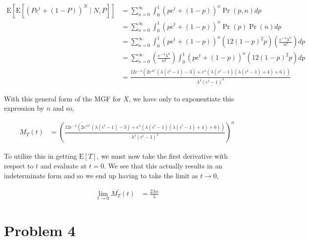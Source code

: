 \documentclass[11pt]{article}
\begin{document}
\begin{align*}
  \mathrm{E}[\mathrm{E}[(Pe^t + (1-P))^N \mid N,P]] &=
                                                      \sum_{n=0}^{\infty}
                                                      \int_0^1
                                                      (pe^t+(1-p))^n
                                                      \Pr{(p,n)} dp \\
  &= \sum_{n=0}^{\infty} \int_0^1 (pe^t+(1-p))^n \Pr{(p)} \Pr{(n)} dp \\
  &= \sum_{n=0}^{\infty} \int_0^1 (pe^t+(1-p))^n \left( 12(1-p)^2 p \right) \left(
\frac{e^{-\lambda} \lambda^n}{n!} \right) dp \\
  &= \sum_{n=0}^{\infty} \left( \frac{e^{-\lambda} \lambda^n}{n!} \right) 
    \int_0^1 (pe^t+(1-p))^n \left( 12(1-p)^2 p \right)  dp \\
  &= \frac{12 e^{-\lambda } \left(2 e^{\lambda  e^t} \left(\lambda
    \left(e^t-1\right)-3\right)+e^{\lambda } \left(\lambda
    \left(e^t-1\right) \left(\lambda
    \left(e^t-1\right)+4\right)+6\right)\right)}{\lambda^4
    \left(e^t-1\right)^4}
\end{align*}

With this general form of the MGF for $X$, we have only to
exponentiate this expression by $n$ and so,


\begin{align*}
  M_T(t) &= \left( \frac{12 e^{-\lambda } \left(2 e^{\lambda  e^t}
           \left(\lambda \left(e^t-1\right)-3\right)+e^{\lambda}
           \left(\lambda \left(e^t-1\right) \left(\lambda
           \left(e^t-1\right)+4\right)+6\right)\right)}{\lambda^4
           \left(e^t-1\right)^4} \right)^n
\end{align*}

To utilize this in getting $\mathrm{E}[T]$, we must now take the first
derivative with respect to $t$ and evaluate at $t=0$.  We see that
this actually results in an indeterminate form and so we end up having
to take the limit as $t \rightarrow 0$,

\begin{align*}
  \lim_{t \rightarrow 0} M_T^'(t) &= \frac{2\lambda n}{5}
\end{align*}

\section*{Problem 4}
\end{document}
